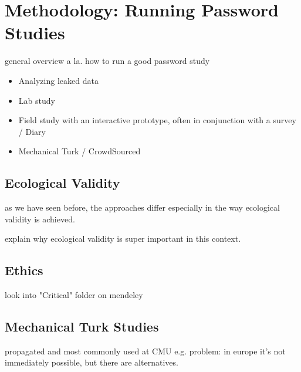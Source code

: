 \section{Methodology: Running Password Studies}

general overview a la. how to run a good password study 

\cite{Krol2016ExperimentDesign,Peer2017,Consolvo2003,Ross2010,Sotirakopoulos2011,Oppenheimer2009InstructionalManipulationChecks,Harbach2016HardLockLife,Barbera2013,Carreras2013,Chamberlain2012ResearchInTheWild,Henze2013EmpiricalResearchUbiquitous,Kuhn1993,VonZezschwitz2013SurvivalShortest,Hassenzahl2003,Mazurek2013Measuring,Egelman2015a,Rosoff2014,Savage2012}

\begin{itemize}
	\item Analyzing leaked data
	\item Lab study \cite{Sotirakopoulos2011}
	\item Field study with an interactive prototype, often in conjunction with a survey / Diary 
	\item Mechanical Turk / CrowdSourced
\end{itemize}




	\subsection{Ecological Validity}
 as we have seen before, the approaches differ especially in the way ecological validity is achieved.
 
 explain why ecological validity is super important in this context.
	

	\subsection{Ethics}
	look into "Critical" folder on mendeley

	\subsection{Mechanical Turk Studies}
	
	propagated and most commonly used at CMU e.g. \cite{Mazurek2013Measuring} \cite{Shay2014CanLongPasswordsBeSecureAndUsable} \cite{Shay2016DesigningPasswordPolicies}
	\cite{Ur2016PerceptionsPassword} \cite{Melicher2016UsabilityMobileTextPasswords} \cite{Ur2017DataDrivenPWMeter}
	problem: in europe it's not immediately possible, but there are alternatives. 
	
